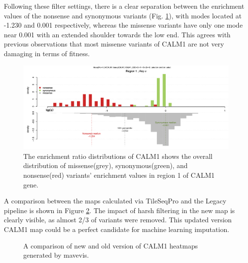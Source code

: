 \documentclass{article}
\begin{document}

Following these filter settings, there is a clear separation between the enrichment values of the nonsense and synonymous variants (Fig. \ref{fig:BCE distribution CALM1}), with modes located at -1.230 and 0.001 respectively, whereas the missense variants have only one mode near 0.001 with an extended shoulder towards the low end. This agrees with previous observations that most missense variants of CALM1 are not very damaging in terms of fitness\cite{weile_framework_2017}.


\begin{figure}[H]
    \centering
    \includegraphics[width =.7\textwidth]{Figures/CALM1/BCE.png}
    \caption{The enrichment ratio distributions of CALM1 shows the overall distribution of missense(grey), synonymous(green), and nonsense(red) variants' enrichment values in region 1 of CALM1 gene. }
    \label{fig:BCE distribution CALM1}
\end{figure}

A comparison between the maps calculated via TileSeqPro and the Legacy pipeline is shown in Figure \ref{fig:final map CALM1}. The impact of harsh filtering in the new map is clearly visible, as almost 2/3 of variants were removed. This updated version CALM1 map could be a perfect candidate for machine learning imputation.

\begin{figure}[H]%
    \centering
    \qquad
    \caption{A comparison of new and old version of CALM1 heatmaps generated by mavevis.}%
    \label{fig:final map CALM1}%
\end{figure}
\end{document}
